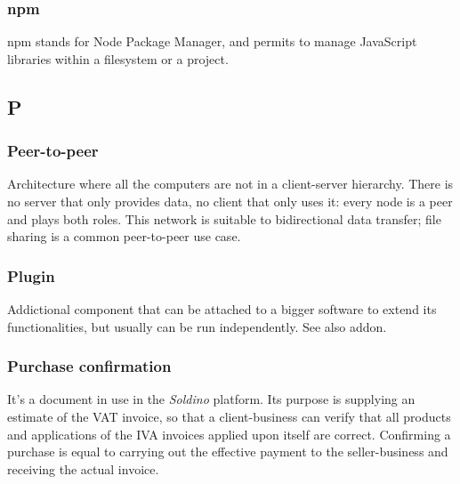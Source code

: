 \subsubsection*{npm}
npm stands for Node Package Manager, and permits to manage JavaScript libraries within a filesystem or a project.




\subsection*{P}

\subsubsection*{Peer-to-peer}
Architecture where all the computers are not in a client-server hierarchy. There is no server that only provides data, no client that only uses it: every node is a peer and plays both roles. This network is suitable to bidirectional data transfer; file sharing is a common peer-to-peer use case.

\subsubsection*{Plugin}
Addictional component that can be attached to a bigger software to extend its functionalities, but usually can be run independently. See also addon\glo.

\subsubsection*{Purchase confirmation}
It's a document in use in the \textit{Soldino} platform.
Its purpose is supplying an estimate of the VAT invoice, so that a client-business can verify that all products and applications of the IVA invoices applied upon itself are correct. Confirming a purchase is equal to carrying out the effective payment to the seller-business and receiving the actual invoice.




